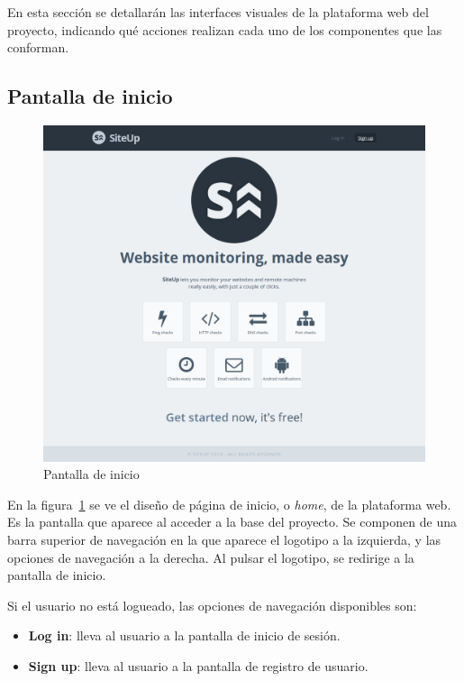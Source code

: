 En esta sección se detallarán las interfaces visuales de la plataforma web del
proyecto, indicando qué acciones realizan cada uno de los componentes que las
conforman.

\subsection{Pantalla de inicio}

\begin{figure}[htbp]
  \centering
  \includegraphics[width=\textwidth]{5_diseno/web-home.png}
  \caption{Pantalla de inicio}
  \label{fig:web-home}
\end{figure}

En la figura~\ref{fig:web-home} se ve el diseño de página de inicio, o
\textit{home}, de la plataforma web. Es la pantalla que aparece al acceder a la
base del proyecto. Se componen de una barra superior de navegación en la que
aparece el logotipo a la izquierda, y las opciones de navegación a la
derecha. Al pulsar el logotipo, se redirige a la pantalla de inicio.

Si el usuario no está logueado, las opciones de navegación disponibles son:

\begin{itemize}
\item \textbf{Log in}: lleva al usuario a la pantalla de inicio de sesión.
\item \textbf{Sign up}: lleva al usuario a la pantalla de registro de usuario.
\end{itemize}

